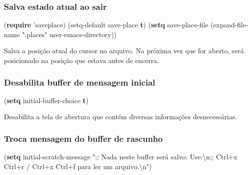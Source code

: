 \documentclass[]{article}
\newenvironment{Shaded}{}{}
\newcommand{\KeywordTok}[1]{\textcolor[rgb]{0.00,0.44,0.13}{\textbf{{#1}}}}
\newcommand{\StringTok}[1]{\textcolor[rgb]{0.25,0.44,0.63}{{#1}}}
\newcommand{\NormalTok}[1]{{#1}}
\begin{document}
\subsubsection{Salva estado atual ao
sair}\label{salva-estado-atual-ao-sair}

\begin{Shaded}
\begin{Highlighting}[]
\NormalTok{(}\KeywordTok{require} \NormalTok{'saveplace)}
\NormalTok{(setq-default save-place }\KeywordTok{t}\NormalTok{)}
\NormalTok{(}\KeywordTok{setq} \NormalTok{save-place-file (expand-file-name}
  \StringTok{".places"} \NormalTok{user-emacs-directory))}
\end{Highlighting}
\end{Shaded}

Salva a posição atual do cursor no arquivo. Na próxima vez que for
aberto, será posicionado na posição que estava antes de encerra.

\subsubsection{Desabilita buffer de mensagem
inicial}\label{desabilita-buffer-de-mensagem-inicial}

\begin{Shaded}
\begin{Highlighting}[]
\NormalTok{(}\KeywordTok{setq} \NormalTok{initial-buffer-choice}
    \KeywordTok{t}\NormalTok{)}
\end{Highlighting}
\end{Shaded}

Desabilita a tela de abertura que contém diversas informações
desnecessárias.

\subsubsection{Troca mensagem do buffer de
rascunho}\label{troca-mensagem-do-buffer-de-rascunho}

\begin{Shaded}
\begin{Highlighting}[]
\NormalTok{(}\KeywordTok{setq} \NormalTok{initial-scratch-message}
    \StringTok{";; Nada neste buffer será salvo. Use:}\NormalTok{\textbackslash{}n}\StringTok{;;}
\StringTok{    Ctrl+x Ctrl+r / Ctrl+x Ctrl+f para ler um arquivo.}\NormalTok{\textbackslash{}n}\StringTok{"}\NormalTok{)}
\end{Highlighting}
\end{Shaded}
\end{document}
